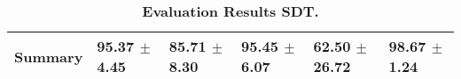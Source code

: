 \begin{table}[htb]
{\begin{tabular}{llllll}
\midrule
\textbf{Summary                                  } &        \phantom{0}95.37 $\pm$ \phantom{0}4.45 &            \phantom{0}85.71 $\pm$ \phantom{0}8.30 &        \phantom{0}95.45 $\pm$ \phantom{0}6.07 &            \phantom{0}62.50 $\pm$ 26.72 &  \phantom{0}98.67 $\pm$ \phantom{0}1.24 \\
\bottomrule
\end{tabular}%
}
\caption{\textbf{Evaluation Results SDT.}}
\label{tab:eval-results}
\end{table}


